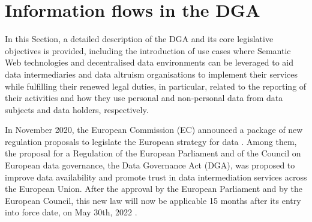 \section{Information flows in the DGA}
\label{sec:dga_flows}

In this Section, a detailed description of the DGA and its core legislative objectives is provided, including the introduction of use cases where Semantic Web technologies and decentralised data environments can be leveraged to aid data intermediaries and data altruism organisations to implement their services while fulfilling their renewed legal duties, in particular, related to the reporting of their activities and how they use personal and non-personal data from data subjects and data holders, respectively.

In November 2020, the European Commission (EC) announced a package of new regulation proposals to legislate the European strategy for data \cite{noauthor_communication_2020}.
Among them, the proposal for a Regulation of the European Parliament and of the Council on European data governance, the Data Governance Act (DGA), was proposed to improve data availability and promote trust in data intermediation services across the European Union.
After the approval by the European Parliament and by the European Council, this new law will now be applicable 15 months after its entry into force date, on May 30th, 2022 \citeyearpar{noauthor_regulation_2022}.

